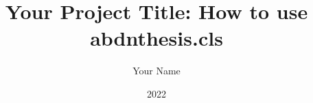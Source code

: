 \documentclass[bsc]{abdnthesis}
\title{Your Project Title: How to use abdnthesis.cls}
\author{Your Name}
\date{2022}
\begin{document}

\maketitle
\makedeclaration


\begin{abstract}
  
\end{abstract}

\begin{acknowledgements}
  
\end{acknowledgements}


\tableofcontents




\appendix
% 





\end{document}
